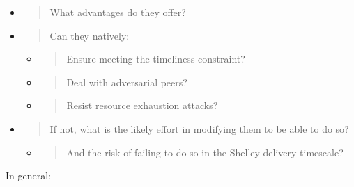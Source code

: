 \documentclass[11pt,a4paper]{article}
\begin{document}
\begin{itemize}
\item
  \begin{quote}
  What advantages do they offer?
  \end{quote}
\item
  \begin{quote}
  Can they natively:
  \end{quote}

  \begin{itemize}
  \item
    \begin{quote}
    Ensure meeting the timeliness constraint?
    \end{quote}
  \item
    \begin{quote}
    Deal with adversarial peers?
    \end{quote}
  \item
    \begin{quote}
    Resist resource exhaustion attacks?
    \end{quote}
  \end{itemize}
\item
  \begin{quote}
  If not, what is the likely effort in modifying them to be able to do
  so?
  \end{quote}

  \begin{itemize}
  \item
    \begin{quote}
    And the risk of failing to do so in the Shelley delivery timescale?
    \end{quote}
  \end{itemize}
\end{itemize}

In general:
\end{document}
